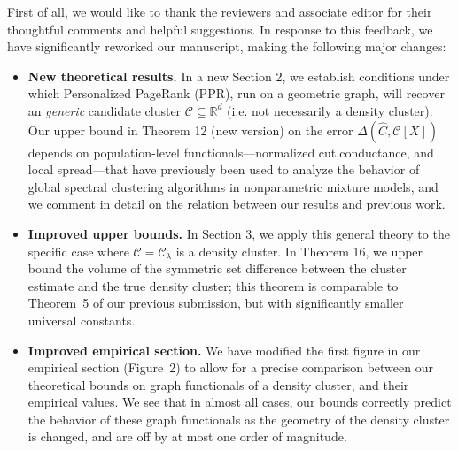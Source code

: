 \documentclass{article}
\newcommand{\Reals}{\mathbb{R}}
\newcommand{\1}{\mathbf{1}}
\newcommand{\Rd}{\Reals^d}
\newcommand{\mc}[1]{\mathcal{#1}}
\newcommand{\wh}[1]{\widehat{#1}}
\theoremstyle{alden}
\theoremstyle{aldenthm}
\theoremstyle{definition}
\theoremstyle{remark}
\begin{document}
First of all, we would like to thank the reviewers and associate editor for their thoughtful comments and helpful suggestions. In response to this feedback, we have significantly reworked our manuscript, making the following major changes: 

\begin{itemize}
	\item \textbf{New theoretical results.} In a new Section 2, we establish conditions under which Personalized PageRank (PPR), run on a geometric graph, will recover an \emph{generic} candidate cluster $\mc{C} \subseteq \Rd$ (i.e. not necessarily a density cluster).  Our upper bound in Theorem 12 (new version) on the error $\Delta(\wh{C},\mc{C}[X])$ depends on population-level functionals---normalized cut,conductance, and local spread---that have previously been used to analyze the behavior of global spectral clustering algorithms in nonparametric mixture models, and we comment in detail on the relation between our results and previous work.
	
	\item \textbf{Improved upper bounds.} In Section 3, we apply this general theory to the specific case where $\mc{C} = \mc{C}_{\lambda}$ is a density cluster. In  Theorem 16, we upper bound the volume of the symmetric set difference between the cluster estimate and the true density cluster; this theorem is comparable to Theorem~5 of our previous submission, but with significantly smaller universal constants.
	
	\item \textbf{Improved empirical section.} We have modified the first figure in our empirical section (Figure~2) to allow for a precise comparison between our theoretical bounds on graph functionals of a density cluster, and their empirical values. We see that in almost all cases, our bounds correctly predict the behavior of these graph functionals as the geometry of the density cluster is changed, and are off by at most one order of magnitude.
	

\end{itemize}
\end{document}
